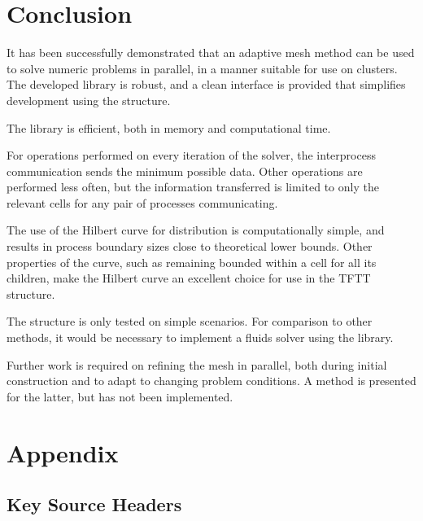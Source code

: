\documentclass[twoside]{IIBproject}
\numberwithin{figure}{section}
\begin{document}



\section{Conclusion} %
    \label{sec:conclusions}

    It has been successfully demonstrated that an adaptive mesh method can be used to solve numeric problems in parallel, in a manner suitable for use on clusters. The developed library is robust, and a clean interface is provided that simplifies development using the structure. 

    The library is efficient, both in memory and computational time. 

    For operations performed on every iteration of the solver, the interprocess communication sends the minimum possible data. Other operations are performed less often, but the information transferred is limited to only the relevant cells for any pair of processes communicating. 

    The use of the Hilbert curve for distribution is computationally simple, and results in process boundary sizes close to theoretical lower bounds. Other properties of the curve, such as remaining bounded within a cell for all its children, make the Hilbert curve an excellent choice for use in the TFTT structure. 

    The structure is only tested on simple scenarios. For comparison to other methods, it would be necessary to implement a fluids solver using the library.

    Further work is required on refining the mesh in parallel, both during initial construction and to adapt to changing problem conditions. A method is presented for the latter, but has not been implemented. 



\begingroup
\raggedright
\sloppy
\printbibliography[heading=bibintoc]
\endgroup


\clearpage
\appendix

\section{Appendix} %
    \label{sec:appendix}

    \subsection{Key Source Headers} %
        \label{sec:appendix-headers}
\end{document}
